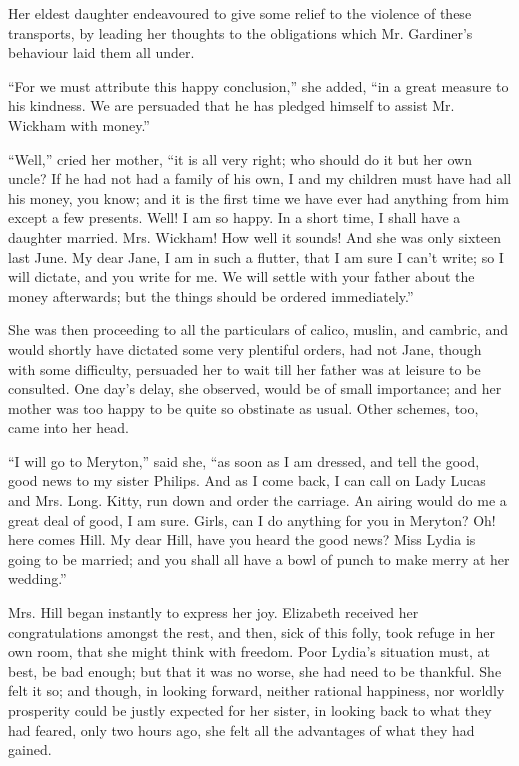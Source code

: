 \documentclass[12pt,openright]{book}
\begin{document}
Her eldest daughter endeavoured to give some relief to the violence of these transports, by leading her thoughts to the obligations which Mr. Gardiner’s behaviour laid them all under.

“For we must attribute this happy conclusion,” she added, “in a great measure to his kindness. We are persuaded that he has pledged himself to assist Mr. Wickham with money.”

“Well,” cried her mother, “it is all very right; who should do it but her own uncle? If he had not had a family of his own, I and my children must have had all his money, you know; and it is the first time we have ever had anything from him except a few presents. Well! I am so happy. In a short time, I shall have a daughter married. Mrs. Wickham! How well it sounds! And she was only sixteen last June. My dear Jane, I am in such a flutter, that I am sure I can’t write; so I will dictate, and you write for me. We will settle with your father about the money afterwards; but the things should be ordered immediately.”

She was then proceeding to all the particulars of calico, muslin, and cambric, and would shortly have dictated some very plentiful orders, had not Jane, though with some difficulty, persuaded her to wait till her father was at leisure to be consulted. One day’s delay, she observed, would be of small importance; and her mother was too happy to be quite so obstinate as usual. Other schemes, too, came into her head.

“I will go to Meryton,” said she, “as soon as I am dressed, and tell the good, good news to my sister Philips. And as I come back, I can call on Lady Lucas and Mrs. Long. Kitty, run down and order the carriage. An airing would do me a great deal of good, I am sure. Girls, can I do anything for you in Meryton? Oh! here comes Hill. My dear Hill, have you heard the good news? Miss Lydia is going to be married; and you shall all have a bowl of punch to make merry at her wedding.”

Mrs. Hill began instantly to express her joy. Elizabeth received her congratulations amongst the rest, and then, sick of this folly, took refuge in her own room, that she might think with freedom. Poor Lydia’s situation must, at best, be bad enough; but that it was no worse, she had need to be thankful. She felt it so; and though, in looking forward, neither rational happiness, nor worldly prosperity could be justly expected for her sister, in looking back to what they had feared, only two hours ago, she felt all the advantages of what they had gained.
\end{document}
